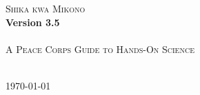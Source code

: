 \begin{titlepage}
\begin{center}
	\textsc{{\Huge Shika kwa Mikono}}\\[0.4cm]
	\textbf{{\Large Version 3.5}}\\[1.5cm]
	\HRule\\[0.4cm]
	\textsc{{\Large A Peace Corps Guide to Hands-On Science}}\\[0.4cm]
	\HRule\\[0.5cm]
\end{center}

\vfill
\begin{center}
	{\large \today}
\end{center}
\end{titlepage}
